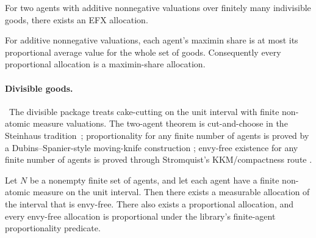 \begin{theorem}
\label{thm:indivisible-efx-two}
For two agents with additive nonnegative valuations over finitely many
indivisible goods, there exists an EFX allocation.
\end{theorem}

\begin{theorem}
\label{thm:mms-average}
For additive nonnegative valuations, each agent's maximin share is at
most its proportional average value for the whole set of goods.
Consequently every proportional allocation is a maximin-share
allocation.
\end{theorem}


\paragraph{Divisible goods.}\
The divisible package treats cake-cutting on the unit interval with
finite non-atomic measure valuations.  The two-agent theorem is
cut-and-choose in the Steinhaus tradition~\citep{Steinhaus1948};
proportionality for any finite number of agents is proved by a
Dubins--Spanier-style moving-knife construction
\citep{DubinsSpanier1961}; envy-free existence for any finite number
of agents is proved through Stromquist's KKM/compactness route
\citep{Stromquist1980}.

\begin{theorem}
\label{thm:divisible-fair-division}
Let $N$ be a nonempty finite set of agents, and let each agent have a
finite non-atomic measure on the unit interval.  Then there exists a
measurable allocation of the interval that is envy-free.  There also
exists a proportional allocation, and every envy-free allocation is
proportional under the library's finite-agent proportionality
predicate.
\end{theorem}



